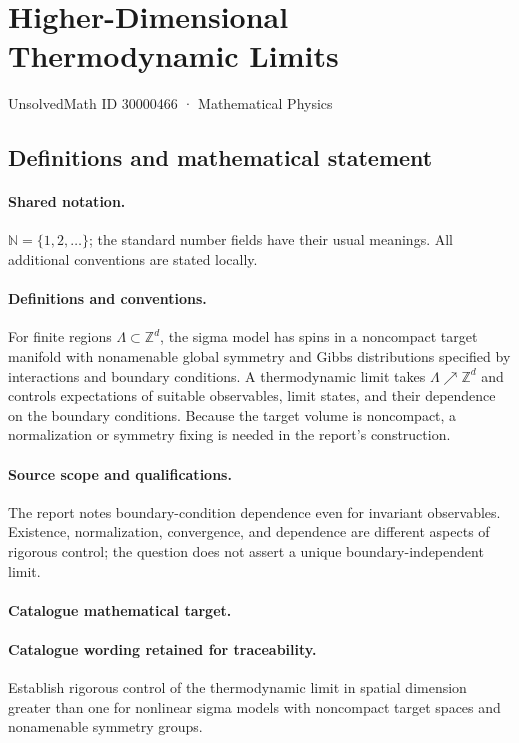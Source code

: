 \documentclass[11pt]{article}
\begin{document}
\setcounter{section}{30000465}
\section{Higher-Dimensional Thermodynamic Limits}\label{30000466}
{\small UnsolvedMath ID 30000466 · Mathematical Physics}
\subsection{Definitions and mathematical statement}

\paragraph{Shared notation.}$\mathbb N=\{1,2,\ldots\}$; the standard number fields have their usual meanings. All additional conventions are stated locally.


\paragraph{Definitions and conventions.} For finite regions $\Lambda\subset\mathbb Z^d$, the sigma model has spins in a noncompact target manifold with nonamenable global symmetry and Gibbs distributions specified by interactions and boundary conditions. A thermodynamic limit takes $\Lambda\nearrow\mathbb Z^d$ and controls expectations of suitable observables, limit states, and their dependence on the boundary conditions. Because the target volume is noncompact, a normalization or symmetry fixing is needed in the report's construction.

\paragraph{Source scope and qualifications.} The report notes boundary-condition dependence even for invariant observables. Existence, normalization, convergence, and dependence are different aspects of rigorous control; the question does not assert a unique boundary-independent limit.

\paragraph{Catalogue mathematical target.}
\paragraph{Catalogue wording retained for traceability.}
Establish rigorous control of the thermodynamic limit in spatial dimension greater than one for nonlinear sigma models with noncompact target spaces and nonamenable symmetry groups.
\end{document}
